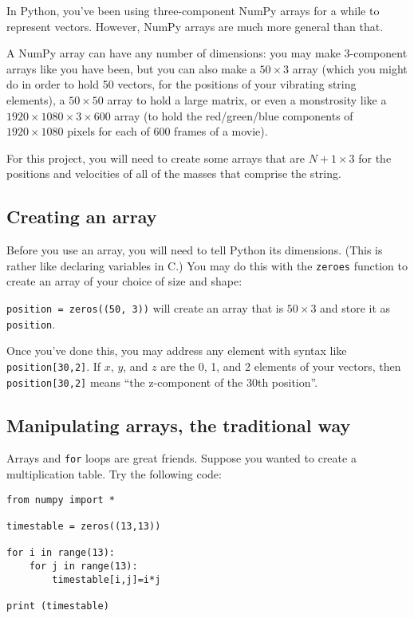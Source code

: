 \documentclass[12ampt]{article}
\begin{document}
\Large
\centerline{} 
\normalsize


In Python, you've been using three-component NumPy arrays for a while to represent vectors. However, NumPy arrays are much more general than that.

A NumPy array can have any number of dimensions: you may make 3-component arrays like you have been, but you can also make a $50\times3$ array (which you might do in order to hold 50 vectors, for the positions of your vibrating string elements), a $50\times50$ array to hold a large matrix,
or even a monstrosity like a $1920 \times 1080 \times 3 \times 600$ array (to hold the red/green/blue components of $1920\times1080$ pixels for each of 600 frames of a movie).

For this project, you will need to create some arrays that are $N+1 \times 3$ for the positions and velocities of all of the masses that comprise the string.

\subsection{Creating an array}

Before you use an array, you will need to tell Python its dimensions. (This is rather like declaring variables in C.) You may do this with the {\tt zeroes} function to create an array of your choice of size and shape:

\verb|position = zeros((50, 3))| will create an array that is $50 \times 3$ and store it as \verb|position|.

Once you've done this, you may address any element with syntax like \verb|position[30,2]|. If $x$, $y$, and $z$ are the 0, 1, and 2 elements of your vectors, then  \verb|position[30,2]| means ``the z-component of the 30th position''.

\subsection{Manipulating arrays, the traditional way}

Arrays and \verb|for| loops are great friends. Suppose you wanted to create a multiplication table. Try the following code:

\begin{verbatim}
from numpy import *

timestable = zeros((13,13))

for i in range(13):
    for j in range(13):
        timestable[i,j]=i*j

print (timestable)
\end{verbatim}
\end{document}
